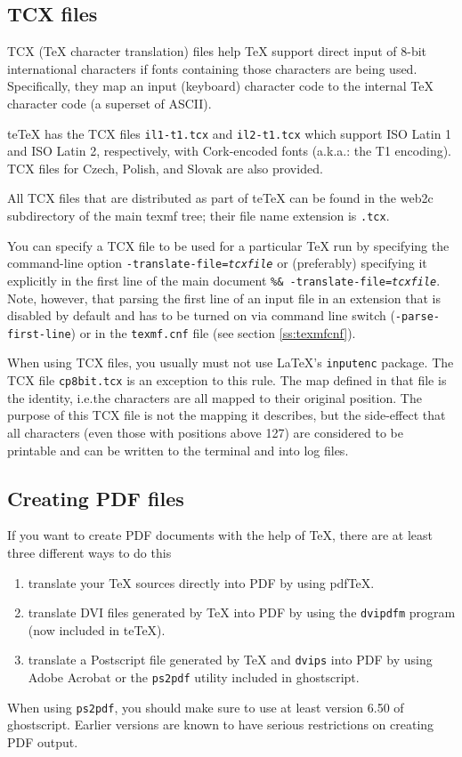\documentclass[11pt,a4paper]{article}
\newcommand{\teTeX}{\textrm{te}\TeX\xspace}
\begin{document}
\subsection{TCX files}
TCX (\TeX{} character translation) files help \TeX{} support direct
input of 8-bit international characters if fonts containing those
characters are being used.  Specifically, they map an input (keyboard)
character code to the internal \TeX{} character code (a superset of
ASCII).

\teTeX{} has the TCX files \verb+il1-t1.tcx+ and \verb+il2-t1.tcx+
which support ISO Latin 1 and ISO Latin 2, respectively, with
Cork-encoded fonts (a.k.a.: the T1 encoding).  TCX files for Czech,
Polish, and Slovak are also provided.

All TCX files that are distributed as part of \teTeX{} can be found in
the web2c subdirectory of the main texmf tree; their file name
extension is \verb+.tcx+.

You can specify a TCX file to be used for a particular \TeX{} run by
specifying the command-line option
\hbox{\texttt{-translate-file=\textsl{tcxfile}}} or (preferably)
specifying it explicitly in the first line of the main document
\hbox{\texttt{\%\& -translate-file=\textsl{tcxfile}}}. Note, however,
that parsing the first line of an input file in an extension that is
disabled by default and has to be turned on via command line switch
(\verb+-parse-first-line+) or in the \verb+texmf.cnf+ file (see
section \ref{ss:texmfcnf}).

When using TCX files, you usually must not use \LaTeX's
\verb+inputenc+ package. The TCX file \verb+cp8bit.tcx+ is an
exception to this rule.  The map defined in that file is the identity,
i.e.\@ the characters are all mapped to their original position. The
purpose of this TCX file is not the mapping it describes, but the
side-effect that all characters (even those with positions above 127)
are considered to be printable and can be written to the terminal and
into log files.


\subsection{Creating PDF files}
If you want to create PDF documents with the help of \TeX, there are
at least three different ways to do this
\begin{enumerate}
\item translate your \TeX{} sources directly into PDF by using pdf\TeX.
\item translate DVI files generated by \TeX{} into PDF by using the
  \texttt{dvipdfm} program (now included in \teTeX).
\item translate a Postscript file generated by \TeX{} and
  \texttt{dvips} into PDF by using Adobe Acrobat or
  the \texttt{ps2pdf} utility included in ghostscript. 
\end{enumerate}
When using \texttt{ps2pdf}, you should make sure to use at least
version 6.50 of ghostscript. Earlier versions are known to have
serious restrictions on creating PDF output.
\end{document}
